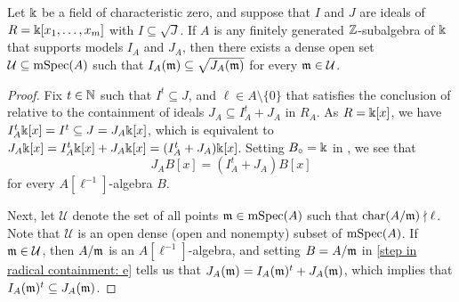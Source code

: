 \documentclass{amsart}
\begin{document}

\begin{corollary}
\label{containment in radical mod p: C}
Let $\Bbbk$ be a field of characteristic zero, and suppose that $I$ and $J$ are ideals of $R = \Bbbk[x_1, \ldots, x_m]$ with $I \subseteq \sqrt{J}$.  If $A$ is any finitely generated $\mathbb{Z}$-subalgebra of $\Bbbk$ that supports models $I_A$ and $J_A$, then there exists a dense open set $\mathcal{U} \subseteq \operatorname{mSpec}(A)$ such that $I_A(\mathfrak{m}) \subseteq \sqrt{J_A(\mathfrak{m})}$ for every $\mathfrak{m} \in \mathcal{U}$.
\end{corollary}

\begin{proof}
   Fix $t \in \mathbb{N}$ such that $I^t \subseteq J$, and $\ell \in A \setminus \{0\}$ that satisfies the conclusion of  relative to the containment of ideals $J_A \subseteq I_A^t + J_A$ in $R_A$.
   As $R = \Bbbk[x]$, we have $I_A^t \Bbbk[x]  = I^t \subseteq J = J_A \Bbbk[x]$, which is equivalent to $J_A \Bbbk[x] = I_A^t \Bbbk[x] + J_A \Bbbk[x] = (I_A^t +J_A)\Bbbk[x]$.
   Setting $B_{\circ} = \Bbbk$ in , we see that
%
\begin{equation}
\label{step in radical containment: e}
 J_A B[x] = (I_A^t +J_A)B[x]
\end{equation}
%
for every $A[\ell^{-1}]$-algebra $B$.

Next, let $\mathcal{U}$ denote the set of all points $\mathfrak{m} \in \operatorname{mSpec}(A)$ such that $\operatorname{char}(A/\mathfrak{m}) \nmid \ell$.  Note that $\mathcal{U}$ is an open dense (\ie open and nonempty) subset of $\operatorname{mSpec}(A)$.  If $\mathfrak{m} \in \mathcal{U}$, then $A/\mathfrak{m}$ is an $A[\ell^{-1}]$-algebra, and setting $B=A/\mathfrak{m}$ in \eqref{step in radical containment: e} tells us that
%
$J_A (\mathfrak{m}) = I_A(\mathfrak{m})^t + J_A(\mathfrak{m})$,
%
which implies that $I_A(\mathfrak{m})^t \subseteq J_A(\mathfrak{m})$.
\end{proof}
\end{document}
